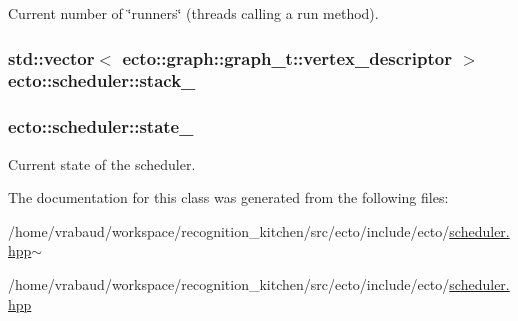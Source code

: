 Current number of \char`\"{}runners\char`\"{} (threads calling a run method). 

\hypertarget{classecto_1_1scheduler_a0c291644c5fc92399a96466ac3b5cc38}{
\subsubsection[{stack\-\_\-}]{\setlength{\rightskip}{0pt plus 5cm}std\-::vector$<$ ecto\-::graph\-::graph\-\_\-t\-::vertex\-\_\-descriptor $>$ ecto\-::scheduler\-::stack\-\_\-\hspace{0.3cm}{\ttfamily [private]}}}\label{classecto_1_1scheduler_a0c291644c5fc92399a96466ac3b5cc38}
\hypertarget{classecto_1_1scheduler_a21d2aac4a8a2ef665942b7c9b741250c}{
\subsubsection[{state\-\_\-}]{ ecto\-::scheduler\-::state\-\_\-\hspace{0.3cm}{\ttfamily [private]}}}\label{classecto_1_1scheduler_a21d2aac4a8a2ef665942b7c9b741250c}


Current state of the scheduler. 



The documentation for this class was generated from the following files\-:\begin{DoxyCompactItemize}
\item 
/home/vrabaud/workspace/recognition\-\_\-kitchen/src/ecto/include/ecto/\hyperlink{scheduler_8hpp~}{scheduler.\-hpp$\sim$}\item 
/home/vrabaud/workspace/recognition\-\_\-kitchen/src/ecto/include/ecto/\hyperlink{scheduler_8hpp}{scheduler.\-hpp}\end{DoxyCompactItemize}

